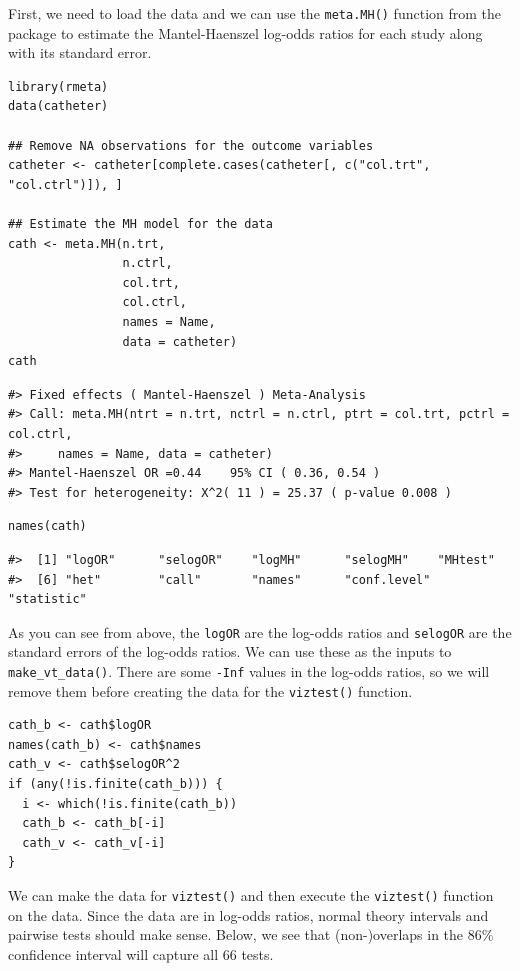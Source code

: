 First, we need to load the data and we can use the \texttt{meta.MH()} function from the  package to estimate the Mantel-Haenszel log-odds ratios for each study along with its standard error.

\begin{verbatim}
library(rmeta)
data(catheter)

## Remove NA observations for the outcome variables
catheter <- catheter[complete.cases(catheter[, c("col.trt", "col.ctrl")]), ]

## Estimate the MH model for the data
cath <- meta.MH(n.trt,
                n.ctrl,
                col.trt,
                col.ctrl,
                names = Name,
                data = catheter)
cath
\end{verbatim}

\begin{verbatim}
#> Fixed effects ( Mantel-Haenszel ) Meta-Analysis
#> Call: meta.MH(ntrt = n.trt, nctrl = n.ctrl, ptrt = col.trt, pctrl = col.ctrl, 
#>     names = Name, data = catheter)
#> Mantel-Haenszel OR =0.44    95% CI ( 0.36, 0.54 )
#> Test for heterogeneity: X^2( 11 ) = 25.37 ( p-value 0.008 )
\end{verbatim}

\begin{verbatim}
names(cath)
\end{verbatim}

\begin{verbatim}
#>  [1] "logOR"      "selogOR"    "logMH"      "selogMH"    "MHtest"    
#>  [6] "het"        "call"       "names"      "conf.level" "statistic"
\end{verbatim}

As you can see from above, the \texttt{logOR} are the log-odds ratios and \texttt{selogOR} are the standard errors of the log-odds ratios. We can use these as the inputs to \texttt{make\_vt\_data()}. There are some \texttt{-Inf} values in the log-odds ratios, so we will remove them before creating the data for the \texttt{viztest()} function.

\begin{verbatim}
cath_b <- cath$logOR
names(cath_b) <- cath$names
cath_v <- cath$selogOR^2
if (any(!is.finite(cath_b))) {
  i <- which(!is.finite(cath_b))
  cath_b <- cath_b[-i]
  cath_v <- cath_v[-i]
}
\end{verbatim}

We can make the data for \texttt{viztest()} and then execute the \texttt{viztest()} function on the data. Since the data are in log-odds ratios, normal theory intervals and pairwise tests should make sense. Below, we see that (non-)overlaps in the \(86\%\) confidence interval will capture all 66 tests.


